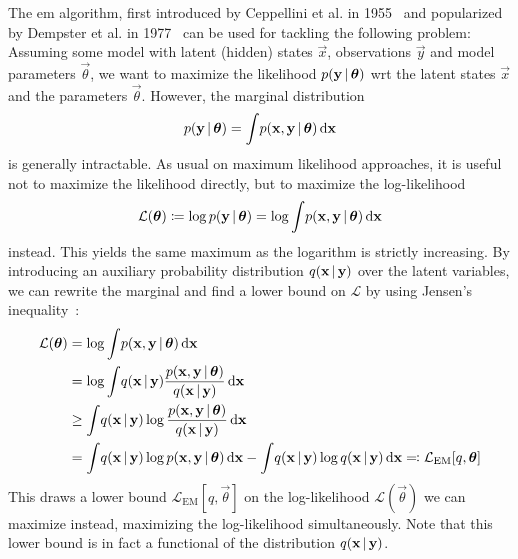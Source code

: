 	The \ac{em} algorithm, first introduced by Ceppellini et al. in 1955~\cite{ceppelliniEstimationGeneFrequencies1955} and popularized by Dempster et al. in 1977~\cite{dempsterMaximumLikelihoodIncomplete1977a} can be used for tackling the following problem: Assuming some model with latent (hidden) states \(\vec{x}\), observations \(\vec{y}\) and model parameters \(\vec{\theta}\), we want to maximize the likelihood \( p(\boldsymbol{\mathrm{y}} \,\vert\, \boldsymbol{\mathrm{\theta}}) \) \ac{wrt} the latent states \(\vec{x}\) and the parameters \(\vec{\theta}\). However, the marginal distribution
	\begin{align*}
		p(\boldsymbol{\mathrm{y}} \,\vert\, \boldsymbol{\mathrm{\theta}}) = \int\! p(\boldsymbol{\mathrm{x}}, \boldsymbol{\mathrm{y}} \,\vert\, \boldsymbol{\mathrm{\theta}}) \dd{\boldsymbol{\mathrm{x}}}
	\end{align*}
	is generally intractable. As usual on maximum likelihood approaches, it is useful not to maximize the likelihood directly, but to maximize the log-likelihood
	\begin{align*}
		\mathcal{L}(\boldsymbol{\mathrm{\theta}}) \coloneqq \log p(\boldsymbol{\mathrm{y}} \,\vert\, \boldsymbol{\mathrm{\theta}}) = \log \int\! p(\boldsymbol{\mathrm{x}}, \boldsymbol{\mathrm{y}} \,\vert\, \boldsymbol{\mathrm{\theta}}) \dd{\boldsymbol{\mathrm{x}}}
	\end{align*}
	instead. This yields the same maximum as the logarithm is strictly increasing. By introducing an auxiliary probability distribution \( q(\boldsymbol{\mathrm{x}} \,\vert\, \boldsymbol{\mathrm{y}}) \) over the latent variables, we can rewrite the marginal and find a lower bound on \(\mathcal{L}\) by using Jensen's inequality~\cite{jensenFonctionsConvexesInegalites1906}:
	\begin{align}
		\mathcal{L}(\boldsymbol{\mathrm{\theta}})
			&= \log \int\! p(\boldsymbol{\mathrm{x}}, \boldsymbol{\mathrm{y}} \,\vert\, \boldsymbol{\mathrm{\theta}}) \dd{\boldsymbol{\mathrm{x}}}  \nonumber \\
			&= \log \int\! q(\boldsymbol{\mathrm{x}} \,\vert\, \boldsymbol{\mathrm{y}}) \frac{p(\boldsymbol{\mathrm{x}}, \boldsymbol{\mathrm{y}} \,\vert\, \boldsymbol{\mathrm{\theta}})}{q(\boldsymbol{\mathrm{x}} \,\vert\, \boldsymbol{\mathrm{y}})} \dd{\boldsymbol{\mathrm{x}}}  \nonumber \\
			&\geq \int\! q(\boldsymbol{\mathrm{x}} \,\vert\, \boldsymbol{\mathrm{y}}) \log \frac{p(\boldsymbol{\mathrm{x}}, \boldsymbol{\mathrm{y}} \,\vert\, \boldsymbol{\mathrm{\theta}})}{q(\boldsymbol{\mathrm{x}} \,\vert\, \boldsymbol{\mathrm{y}})} \dd{\boldsymbol{\mathrm{x}}}  \nonumber \\
			&= \int\! q(\boldsymbol{\mathrm{x}} \,\vert\, \boldsymbol{\mathrm{y}}) \log p(\boldsymbol{\mathrm{x}}, \boldsymbol{\mathrm{y}} \,\vert\, \boldsymbol{\mathrm{\theta}}) \dd{\boldsymbol{\mathrm{x}}} - \int\! q(\boldsymbol{\mathrm{x}} \,\vert\, \boldsymbol{\mathrm{y}}) \log q(\boldsymbol{\mathrm{x}} \,\vert\, \boldsymbol{\mathrm{y}}) \dd{\boldsymbol{\mathrm{x}}} \eqqcolon \mathcal{L}_\mathrm{EM}[q, \boldsymbol{\mathrm{\theta}}]  \label{eq:emLowerBound}
	\end{align}
	This draws a lower bound \( \mathcal{L}_\mathrm{EM}[q, \vec{\theta}] \) on the log-likelihood \( \mathcal{L}(\vec{\theta}) \) we can maximize instead, maximizing the log-likelihood simultaneously. Note that this lower bound is in fact a functional of the distribution \( q(\boldsymbol{\mathrm{x}} \,\vert\, \boldsymbol{\mathrm{y}}) \).

